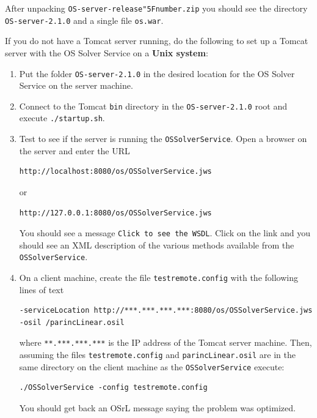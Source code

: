 \documentclass[11pt]{article}
\renewcommand{\_}{{\char"5F}}
\renewcommand{\{}{{\char"7B}}
\renewcommand{\}}{{\char"7D}}
\renewcommand{\^}{{\char"0D}}
\renewcommand{\'}{{\char"0D}}
\begin{document}
\begin{enumerate}[Step 1:]
After unpacking
{\tt OS-server-release\_number.zip} you should see the  directory {\tt OS-server-2.1.0} and a single file {\tt os.war}.

If you do not have a Tomcat server running, do the following to set up a  Tomcat server
with the OS Solver Service on a {\bf Unix system}:

\begin{enumerate}[Step 1.]
\item{}  Put the folder  {\tt OS-server-2.1.0}   in the desired location for the OS Solver Service on the server machine.

\item{} Connect to the Tomcat {\tt bin} directory in the {\tt OS-server-2.1.0} root and execute {\tt ./startup.sh}.

\item{} \label{itemize:tomcatunix3}
Test to see if the server is running the {\tt OSSolverService}.  Open a browser on the server and enter the URL
\begin{verbatim}
http://localhost:8080/os/OSSolverService.jws
\end{verbatim}
or
\begin{verbatim}
http://127.0.0.1:8080/os/OSSolverService.jws
\end{verbatim}
You should see a message {\tt Click to see the WSDL}.  Click on the link and you should see an XML description of
the various methods available from the {\tt OSSolverService}.

\item{}  \label{itemize:tomcatunix4}
On a client machine, create  the file {\tt testremote.config} with the following lines of text
\begin{verbatim}
-serviceLocation http://***.***.***.***:8080/os/OSSolverService.jws
-osil /parincLinear.osil
\end{verbatim}
where {\tt ***.***.***.***} is the IP address of the Tomcat server machine. Then, assuming the files
{\tt testremote.config} and {\tt parincLinear.osil} are in the same directory on the client machine as the
{\tt OSSolverService} execute:
\begin{verbatim}
./OSSolverService -config testremote.config
\end{verbatim}
You should get back an OSrL message saying the problem was optimized.

\end{enumerate}


\end{enumerate}
\end{document}
